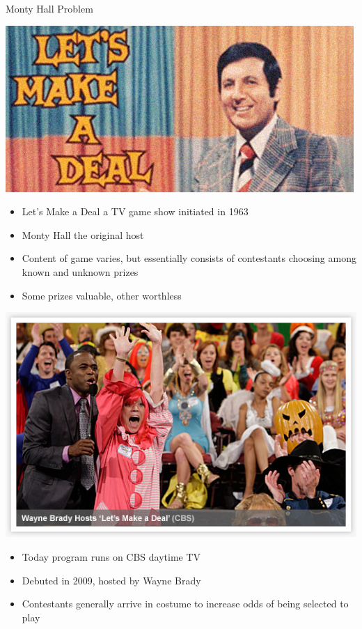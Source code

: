 \documentclass{beamer}
\theoremstyle{definition}
\begin{document}
\begin{frame}{Monty Hall Problem}
\begin{center}\includegraphics[scale=.5]{LetsMakeDeal}\end{center}
\begin{itemize}
\item \alert{Let's Make a Deal} a TV game show
initiated in 1963
\item Monty Hall the original host
\item Content of game varies, but essentially
consists of contestants choosing among known and unknown prizes
\item Some prizes valuable, other worthless
\end{itemize}
\end{frame}

\begin{frame}
\begin{center}\includegraphics[scale=.5]{WayneBrady}\end{center}
\begin{itemize}
\item Today program runs on CBS daytime TV
\item Debuted in 2009, hosted by Wayne Brady
\item Contestants generally arrive in costume
to increase odds of being selected to play
\end{itemize}
\end{frame}
\end{document}
